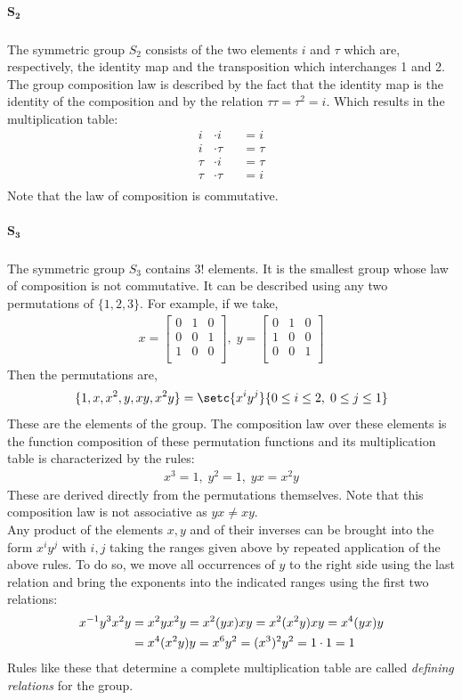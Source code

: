 \documentclass[MathsNotesBase.tex]{subfiles}
\begin{document}
{	\subparagraph{$\bm{S_2}$}
	The symmetric group $S_2$ consists of the two elements $i$ and $\tau$ which are, respectively, the identity map and the transposition which interchanges 1 and 2. The group composition law is described by the fact that the identity map is the identity of the composition and by the relation $\tau\tau = \tau^2 = i$. Which results in the multiplication table:	
	\[
	\begin{aligned}
		i &\cdot i &&= i \\
		i &\cdot \tau &&= \tau \\		
		\tau &\cdot i &&= \tau \\
		\tau &\cdot \tau &&= i \\
	\end{aligned}
	\]
	Note that the law of composition is commutative.
	\subparagraph{$\bm{S_3}$}\label{S_3}
	The symmetric group $S_3$ contains $3!$ elements. It is the smallest group whose law of composition is not commutative. It can be described using any two permutations of $\{1, 2, 3\}$. For example, if we take,
	\begin{align*}
		x =
		\begin{bmatrix}
		0 & 1 & 0 \\
		0 & 0 & 1 \\
		1 & 0 & 0 \\
		\end{bmatrix},\;
		y =
		\begin{bmatrix}
		0 & 1 & 0 \\
		1 & 0 & 0 \\
		0 & 0 & 1 \\
		\end{bmatrix}
	\end{align*}
	Then the permutations are,
	\[ \{1, x, x^2, y, xy, x^2y\} = \setc{x^iy^j}{0 \leq i \leq 2,\; 0 \leq j \leq 1} \]
	These are the elements of the group. The composition law over these elements is the function composition of these permutation functions and its multiplication table is characterized by the rules:
	\begin{align*}
		x^3 = 1,\; y^2 = 1,\; yx = x^2y
	\end{align*}
	These are derived directly from the permutations themselves. Note that this composition law is not associative as $yx \neq xy$. \\
	Any product of the elements $x,y$ and of their inverses can be brought into the form $x^iy^j$ with $i,j$ taking the ranges given above by repeated application of the above rules. To do so, we move all occurrences of $y$  to the right side using the last relation and bring the exponents into the indicated ranges using the first two relations:
	\begin{align*} 
		{x}^{-1}y^3x^2y &= x^2yx^2y = x^2(yx)xy = x^2(x^2y)xy = x^4(yx)y\\
					&= x^4(x^2y)y = x^6y^2 = (x^3)^2y^2 = 1 \cdot 1 = 1
	\end{align*}
	Rules like these that determine a complete multiplication table are called \textit{defining relations} for the group.	
}
\end{document}
